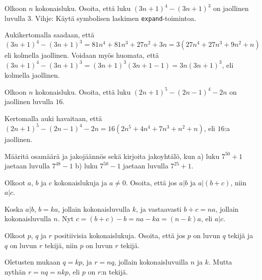 \begin{kotitehtavasivu}
\begin{tehtava}
	Olkoon $n$ kokonaisluku. Osoita, että luku $(3n+1)^4 - (3n+1)^3$ on jaollinen luvulla 3. Vihje: Käytä symbolisen laskimen {\tt expand}-toimintoa.
	\begin{vastaus}
	Aukikertomalla saadaan, että $(3n+1)^4-(3n+1)^3 = 81n^4 +81n^3 + 27n^2+ 3n = 3(27n^4 + 27n^3 + 9n^2 + n)$ eli kolmella jaollinen. Voidaan myös huomata, että $(3n+1)^4-(3n+1)^3 = (3n+1)^3(3n + 1 - 1) = 3n(3n+1)^3$, eli kolmella jaollinen.
	\end{vastaus}
\end{tehtava}

\begin{tehtava}
	Olkoon $n$ kokonaisluku. Osoita, että luku $(2n+1)^5 - (2n-1)^4-2n$ on jaollinen luvulla $16$.
	\begin{vastaus}
	Kertomalla auki havaitaan, että $(2n+1)^5 - (2n-1)^4-2n = 16(2n^5+4n^4+7n^3+n^2 + n)$, eli $16$:a jaollinen.
	\end{vastaus}
\end{tehtava}

\begin{tehtava}
	Määritä osamäärä ja jakojäännös sekä kirjoita jakoyhtälö, kun a) luku $7^{50} + 1$ jaetaan luvulla $7^{48} - 1$ b) luku $7^{50} - 1$ jaetaan luvulla $7^{25} + 1$.
	\begin{vastaus}
	\end{vastaus}
\end{tehtava}

\begin{tehtava}
	Olkoot $a$, $b$ ja $c$ kokonaislukuja ja $a \neq 0$. Osoita, että jos $a|b$ ja $a|(b + c)$, niin $a|c$.
	\begin{vastaus}
	Koska $a | b$, $b = ka$, jollain kokonaisluvulla $k$, ja vastaavasti $b + c = na$, jollain kokonaisluvulla $n$. Nyt $c = (b + c) - b = na - ka = (n - k)a$, eli $a | c$.
	\end{vastaus}
\end{tehtava}

\begin{tehtava}
	Olkoot $p$, $q$ ja $r$ positiivisia kokonaislukuja. Osoita, että jos $p$ on luvun $q$ tekijä ja $q$ on luvun $r$ tekijä, niin $p$ on luvun $r$ tekijä.
	\begin{vastaus}
	Oletusten mukaan $q = kp$, ja $r = nq$, jollain kokonaisluvuilla $n$ ja $k$. Mutta nythän $r = nq = nkp$, eli $p$ on $r$:n tekijä.
	\end{vastaus}
\end{tehtava}


\end{kotitehtavasivu}
